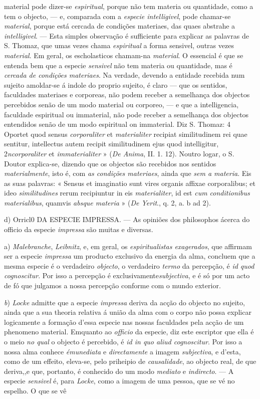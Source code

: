 material pode dizer-se \emph{espiritual}, porque não tem materia ou quantidade, como a tem o objecto, --- e, comparada com a \emph{especie intelligivel}, pode chamar-se \emph{material}, porque está cercada de condições materiaes, das quaes abstrahe a \emph{intelligivel}. --- Esta simples observação é sufficiente para explicar as palavras de S. Thomaz, que umas vezes chama \emph{espiritual} a forma sensivel, outras vezes \emph{material}. Em geral, os escholasticos chamam-na \emph{material}. O essencial é que se entenda bem que a especie \emph{sensivel} não tem materia ou quantidade, mas é \emph{cercada de condições materiaes}. Na verdade, devendo a entidade recebida num sujeito amoldar-se á indole do proprio sujeito, é claro --- que os sentidos, faculdades materiaes e corporeas, não podem receber a semelhança dos objectos percebidos senão de um modo material ou corporeo, --- e que a intelligencia, faculdade espiritual ou immaterial, não pode receber a semelhança dos objectos entendidos senão de um modo espiritual on immaterial. Diz S. Thomaz: 4 Oportet quod sensus \emph{corporaliter} et \emph{materialiter} recipiat similitudinem rei quae sentitur, intellectus autem recipit similitudinem ejus quod intelligitur, 2\emph{ncorporaliter} et \emph{immaterialiter} » (\emph{De Anima}, II. 1. 12). Noutro logar, o S. Doutor explica-se, dizendo que os objectos são recebidos nos sentidos \emph{materialmente}, isto é, com \emph{as condições materiaes}, ainda que \emph{sem a materia}. Eis as suas palavras: « Sensus et imaginatio sunt vires organis affixae corporalibus; et ideo \emph{similitudines} rerum recipiuntur in eis \emph{materialiter}, id est \emph{cum conditionibus materialibus}, quamvis \emph{absque materia} » (\emph{De Yerit}., q. 2, a. b ad 2).\par d) Orricl0 DA ESPECIE IMPRESSA. --- As opiniões dos philosophos ácerca do officio da especie \emph{impressa} são muitas e diversas.\par a) \emph{Malebranche}, \emph{Leibnitz}, e, em geral, os \emph{espiritualistas exagerados}, que affirmam ser a especie \emph{impressa} um producto exclusivo da energia da alma, concluem que a mesma especie é o verdadeiro \emph{objecto}, o verdadeiro \emph{termo} da percepção, é \emph{id quod cognoscitur}. Por isso a percepção é exclusivamente\emph{subjectiva}, e é só por um acto de fó que julgamos a nossa percepção conforme com o mundo exterior.\par \emph{b}) \emph{Locke} admitte que a especie \emph{impressa} deriva da acção do objecto no sujeito, ainda que a sua theoria relativa á união da alma com o corpo não possa explicar logicamente a formação d'essa especie nas nossas faculdades pela acção de um phenomeno material. Emquanto ao \emph{officio} da especie, diz este escriptor que ella é o meio \emph{no qual} o objecto é percebido, é \emph{id in quo aliud cognoscitur}. Por isso a nossa alma conhece \emph{émunediata} e \emph{directamente} a imagem \emph{subjectiva}, e d'esta, como de um effeito, eleva-se, pelo priheipio de \emph{causalidade}, ao objecto real, de que deriva,,e que, portanto, é conhecido do um modo \emph{mediato} e \emph{indirecto}. --- A especie \emph{sensivel} é, para \emph{Locke}, como a imagem de uma pessoa, que se vé no espelho. O que se vê 